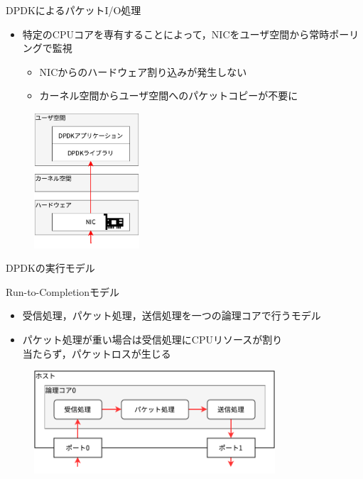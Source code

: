 \documentclass[12pt, unicode]{beamer}
\begin{document}
\begin{frame}{DPDKによるパケットI/O処理}
  \begin{itemize}
    \item 特定のCPUコアを専有することによって，NICをユーザ空間から常時ポーリングで監視
    \begin{itemize}
      \item NICからのハードウェア割り込みが発生しない
      \item カーネル空間からユーザ空間へのパケットコピーが不要に
    \end{itemize}
  \end{itemize}

  \begin{figure}[h]
    \centering
    \includegraphics[width=0.35\textwidth]{pictures/DPDKPacketIO.pdf}
  \end{figure}
\end{frame}

\begin{frame}{DPDKの実行モデル}
  \begin{block}{Run-to-Completionモデル}
    \begin{itemize}
      \item 受信処理，パケット処理，送信処理を一つの論理コアで行うモデル
      \item パケット処理が重い場合は受信処理にCPUリソースが割り\\当たらず，パケットロスが生じる
    \end{itemize}
  \end{block}

  \begin{figure}[h]
    \centering
    \includegraphics[width=0.8\textwidth]{pictures/RunToCompletion.pdf}
  \end{figure}
\end{frame}
\end{document}
